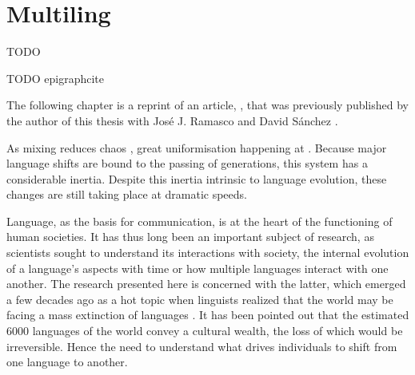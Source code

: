 \documentclass[../thesis.tex]{subfiles}
\begin{document}
\chapter{Multiling}
\label{ch:multiling}

\epigraph{
  TODO
}{
  TODO epigraphcite
}

The following chapter is a reprint of an article, , that
was previously published by the author of this thesis with Jos\'{e} J. Ramasco and David S\'{a}nchez \cite{LoufCapturingDiversity2021}.


As mixing reduces chaos , great uniformisation happening at .
Because major language shifts are bound to the passing of generations, this system has a considerable inertia. Despite this inertia intrinsic to language evolution, these changes are still taking place at dramatic speeds.


Language, as the basis for communication, is at the heart of the functioning of human
societies. It has thus long been an important subject of research, as scientists sought
to understand its interactions with society, the internal evolution of a language's
aspects with time or how multiple languages interact with one another. The research
presented here is concerned with the latter, which emerged a few decades ago as a hot
topic when linguists realized that the world may be facing a mass extinction of
languages
\cite{KraussWorldLanguages1992,GrenobleEndangeredLanguages1998,CrystalLanguageDeath2000}.
It has been pointed out that the estimated \SI{6000}{} languages of the world convey a
cultural wealth, the loss of which would be irreversible. Hence the need to understand
what drives individuals to shift from one language to another.
\end{document}
